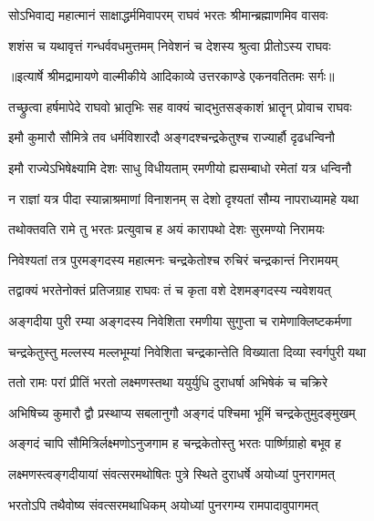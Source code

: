 \twolineshloka
{सोऽभिवाद्य महात्मानं साक्षाद्धर्ममिवापरम्}
{राघवं भरतः श्रीमान्ब्रह्माणमिव वासवः} %

\twolineshloka
{शशंस च यथावृत्तं गन्धर्ववधमुत्तमम्}
{निवेशनं च देशस्य श्रुत्वा प्रीतोऽस्य राघवः} %


{॥इत्यार्षे श्रीमद्रामायणे वाल्मीकीये आदिकाव्ये उत्तरकाण्डे एकनवतितमः सर्गः॥}


\twolineshloka
{तच्छ्रुत्वा हर्षमापेदे राघवो भ्रातृभिः सह}
{वाक्यं चाद्भुतसङ्काशं भ्रातॄन् प्रोवाच राघवः} %

\twolineshloka
{इमौ कुमारौ सौमित्रे तव धर्मविशारदौ}
{अङ्गदश्चन्द्रकेतुश्च राज्यार्हौ दृढधन्विनौ} %

\twolineshloka
{इमौ राज्येऽभिषेक्ष्यामि देशः साधु विधीयताम्}
{रमणीयो ह्यसम्बाधो रमेतां यत्र धन्विनौ} %

\twolineshloka
{न राज्ञां यत्र पीदा स्यान्नाश्रमाणां विनाशनम्}
{स देशो दृश्यतां सौम्य नापराध्यामहे यथा} %

\twolineshloka
{तथोक्तवति रामे तु भरतः प्रत्युवाच ह}
{अयं कारापथो देशः सुरमण्यो निरामयः} %

\twolineshloka
{निवेश्यतां तत्र पुरमङ्गदस्य महात्मनः}
{चन्द्रकेतोश्च रुचिरं चन्द्रकान्तं निरामयम्} %

\twolineshloka
{तद्वाक्यं भरतेनोक्तं प्रतिजग्राह राघवः}
{तं च कृता वशे देशमङ्गदस्य न्यवेशयत्} %

\twolineshloka
{अङ्गदीया पुरी रम्या अङ्गदस्य निवेशिता}
{रमणीया सुगुप्ता च रामेणाक्लिष्टकर्मणा} %

\twolineshloka
{चन्द्रकेतुस्तु मल्लस्य मल्लभूम्यां निवेशिता}
{चन्द्रकान्तेति विख्याता दिव्या स्वर्गपुरी यथा} %

\twolineshloka
{ततो रामः परां प्रीतिं भरतो लक्ष्मणस्तथा}
{ययुर्युधि दुराधर्षा अभिषेकं च चक्रिरे} %

\twolineshloka
{अभिषिच्य कुमारौ द्वौ प्रस्थाप्य सबलानुगौ}
{अङ्गदं पश्चिमा भूमिं चन्द्रकेतुमुदङ्मुखम्} %

\twolineshloka
{अङ्गदं चापि सौमित्रिर्लक्ष्मणोऽनुजगाम ह}
{चन्द्रकेतोस्तु भरतः पार्ष्णिग्राहो बभूव ह} %

\twolineshloka
{लक्ष्मणस्त्वङ्गदीयायां संवत्सरमथोषितः}
{पुत्रे स्थिते दुराधर्षे अयोध्यां पुनरागमत्} %

\twolineshloka
{भरतोऽपि तथैवोष्य संवत्सरमथाधिकम्}
{अयोध्यां पुनरगम्य रामपादावुपागमत्} %

